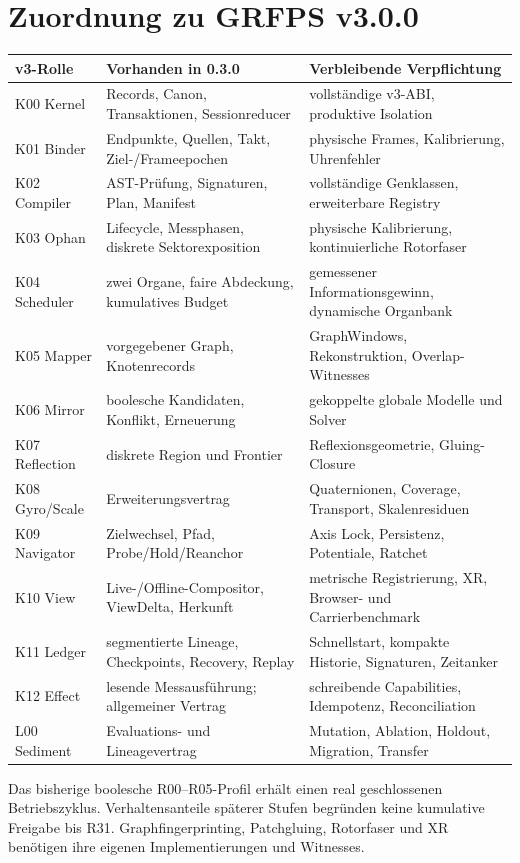 \documentclass[11pt,a4paper]{article}
\newcommand{\nextsection}[2]{\clearpage{\color{accent}\small\textsf{#1}}\section{#2}}
\begin{document}
\nextsection{21 / REALISIERUNG}{Zuordnung zu GRFPS v3.0.0}
\small
\begin{longtable}{@{}p{.17\linewidth}p{.36\linewidth}p{.40\linewidth}@{}}
\toprule
v3-Rolle & Vorhanden in 0.3.0 & Verbleibende Verpflichtung\\\midrule
\endhead
K00 Kernel & Records, Canon, Transaktionen, Sessionreducer &
vollständige v3-ABI, produktive Isolation\\
K01 Binder & Endpunkte, Quellen, Takt, Ziel-/Frameepochen &
physische Frames, Kalibrierung, Uhrenfehler\\
K02 Compiler & AST-Prüfung, Signaturen, Plan, Manifest &
vollständige Genklassen, erweiterbare Registry\\
K03 Ophan & Lifecycle, Messphasen, diskrete Sektorexposition &
physische Kalibrierung, kontinuierliche Rotorfaser\\
K04 Scheduler & zwei Organe, faire Abdeckung, kumulatives Budget &
gemessener Informationsgewinn, dynamische Organbank\\
K05 Mapper & vorgegebener Graph, Knotenrecords &
GraphWindows, Rekonstruktion, Overlap-Witnesses\\
K06 Mirror & boolesche Kandidaten, Konflikt, Erneuerung &
gekoppelte globale Modelle und Solver\\
K07 Reflection & diskrete Region und Frontier &
Reflexionsgeometrie, Gluing-Closure\\
K08 Gyro/Scale & Erweiterungsvertrag &
Quaternionen, Coverage, Transport, Skalenresiduen\\
K09 Navigator & Zielwechsel, Pfad, Probe/Hold/Reanchor &
Axis Lock, Persistenz, Potentiale, Ratchet\\
K10 View & Live-/Offline-Compositor, ViewDelta, Herkunft &
metrische Registrierung, XR, Browser- und Carrierbenchmark\\
K11 Ledger & segmentierte Lineage, Checkpoints, Recovery, Replay &
Schnellstart, kompakte Historie, Signaturen, Zeitanker\\
K12 Effect & lesende Messausführung; allgemeiner Vertrag &
schreibende Capabilities, Idempotenz, Reconciliation\\
L00 Sediment & Evaluations- und Lineagevertrag &
Mutation, Ablation, Holdout, Migration, Transfer\\
\bottomrule
\end{longtable}
\normalsize

Das bisherige boolesche R00--R05-Profil erhält einen real
geschlossenen Betriebszyklus. Verhaltensanteile späterer
Stufen begründen keine kumulative Freigabe bis R31.
Graphfingerprinting, Patchgluing, Rotorfaser und XR benötigen
ihre eigenen Implementierungen und Witnesses.
\end{document}
